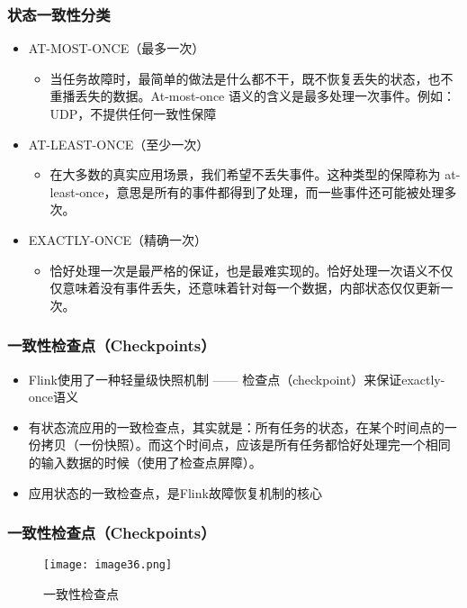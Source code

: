 \documentclass{beamer}
\begin{document}
  \begin{frame}
      \frametitle{状态一致性分类}
  
      \begin{itemize}
          \item AT-MOST-ONCE（最多一次）
          \begin{itemize}
              \item 当任务故障时，最简单的做法是什么都不干，既不恢复丢失的状态，也不重播丢失的数据。At-most-once 语义的含义是最多处理一次事件。例如：UDP，不提供任何一致性保障
          \end{itemize}
          \item AT-LEAST-ONCE（至少一次）
          \begin{itemize}
              \item 在大多数的真实应用场景，我们希望不丢失事件。这种类型的保障称为 at-least-once，意思是所有的事件都得到了处理，而一些事件还可能被处理多次。
          \end{itemize}
          \item EXACTLY-ONCE（精确一次）
          \begin{itemize}
              \item 恰好处理一次是最严格的保证，也是最难实现的。恰好处理一次语义不仅仅意味着没有事件丢失，还意味着针对每一个数据，内部状态仅仅更新一次。
          \end{itemize}
      \end{itemize}
  
  \end{frame}

  \begin{frame}
      \frametitle{一致性检查点（Checkpoints）}
  
      \begin{itemize}
          \item Flink使用了一种轻量级快照机制 —— 检查点（checkpoint）来保证exactly-once语义
          \item 有状态流应用的一致检查点，其实就是：所有任务的状态，在某个时间点的一份拷贝（一份快照）。而这个时间点，应该是所有任务都恰好处理完一个相同的输入数据的时候（使用了检查点屏障）。
          \item 应用状态的一致检查点，是Flink故障恢复机制的核心
      \end{itemize}
  
  \end{frame}

  \begin{frame}
      \frametitle{一致性检查点（Checkpoints）}
      
      \begin{figure}
      	\centering
      	\texttt{[image: image36.png]}
      	\caption{一致性检查点}
      \end{figure}
  
  \end{frame}
\end{document}
